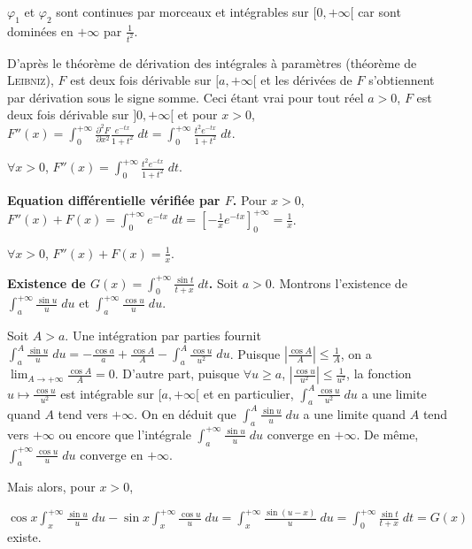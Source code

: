{{$\varphi_1$ et $\varphi_2$ sont continues par morceaux et intégrables sur $[0,+\infty[$ car sont dominées en $+\infty$ par $ \frac{1}{t^2}$.
 
 
 

 
 
D'après le théorème de dérivation des intégrales à paramètres (théorème de \textsc{Leibniz}), $F$ est deux fois dérivable sur $[a,+\infty[$ et les dérivées de $F$ s'obtiennent par dérivation sous le signe somme. Ceci étant vrai pour tout réel $a>0$, $F$ est deux fois dérivable sur $]0,+\infty[$ et pour $x>0$, $F''(x)=\int_{0}^{+\infty} \frac{\partial^2F}{\partial x^2} \frac{e^{-tx}}{1+t^2}\;dt=\int_{0}^{+\infty} \frac{t^2e^{-tx}}{1+t^2}\;dt$.

\begin{center}
$\forall x>0$, $F''(x)=\int_{0}^{+\infty} \frac{t^2e^{-tx}}{1+t^2}\;dt$.
\end{center}

\textbf{Equation différentielle vérifiée par $F$.} Pour $x>0$, $F''(x)+F(x)=\int_{0}^{+\infty}e^{-tx}\;dt=\left[- \frac{1}{x}e^{-tx}\right]_0^{+\infty}= \frac{1}{x}$.

\begin{center}
$\forall x>0$, $F''(x)+F(x)= \frac{1}{x}$.
\end{center}

\textbf{Existence de $G(x)=\int_{0}^{+\infty} \frac{\sin t}{t+x}\;dt$.} Soit $a>0$. Montrons l'existence de $\int_{a}^{+\infty} \frac{\sin u}{u}\;du$ et $\int_{a}^{+\infty} \frac{\cos u}{u}\;du$.

Soit $A>a$. Une intégration par parties fournit $\int_{a}^{A} \frac{\sin u}{u}\;du=- \frac{\cos a}{a}+ \frac{\cos A}{A}-\int_{a}^{A} \frac{\cos u}{u^2}\;du$. Puisque $\left| \frac{\cos A}{A}\right|\leqslant \frac{1}{A}$, on a $\lim_{A \rightarrow +\infty} \frac{\cos A}{A}=0$. D'autre part, puisque $\forall u\geqslant a$, $\left| \frac{\cos u}{u^2}\right|\leqslant \frac{1}{u^2}$, la fonction $u\mapsto \frac{\cos u}{u^2}$ est intégrable sur $[a,+\infty[$ et en particulier, $\int_{a}^{A} \frac{\cos u}{u^2}\;du$ a une limite quand $A$ tend vers $+\infty$. On en déduit que $\int_{a}^{A} \frac{\sin u}{u}\;du$ a une limite quand $A$ tend vers $+\infty$ ou encore que l'intégrale $\int_{a}^{+\infty} \frac{\sin u}{u}\;du$ converge en $+\infty$. De même, $\int_{a}^{+\infty} \frac{\cos u}{u}\;du$ converge en $+\infty$. 

Mais alors, pour $x>0$,

\begin{center}
$\cos x\int_{x}^{+\infty} \frac{\sin u}{u}\;du-\sin x\int_{x}^{+\infty} \frac{\cos u}{u}\;du=\int_{x}^{+\infty} \frac{\sin(u-x)}{u}\;du=\int_{0}^{+\infty} \frac{\sin t}{t+x}\;dt=G(x)$ existe.
\end{center}

}}
